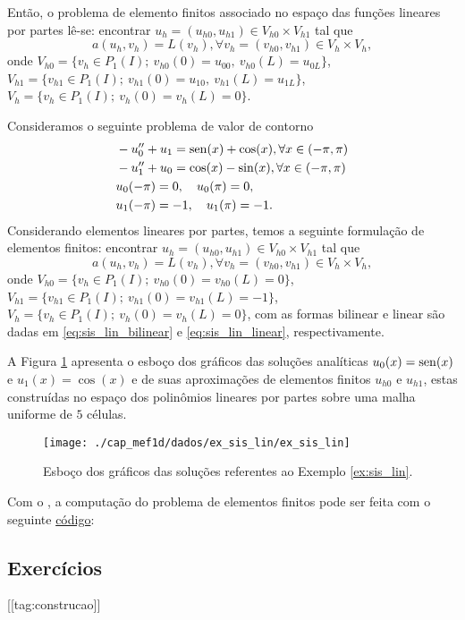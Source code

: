 Então, o problema de elemento finitos associado no espaço das funções lineares por partes lê-se: encontrar $u_h = (u_{h0}, u_{h1})\in V_{h0}\times V_{h1}$ tal que
\begin{equation}
  a(u_h, v_h) = L(v_h), \forall v_h = (v_{h0}, v_{h1})\in V_h\times V_h,
\end{equation}
onde $V_{h0} = \{v_h\in P_1(I);~v_{h0}(0)=u_{00},~v_{h0}(L)=u_{0L}\}$, $V_{h1}=\{v_{h1}\in P_1(I);~v_{h1}(0)=u_{10},~v_{h1}(L)=u_{1L}\}$, $V_h = \{v_h\in P_1(I);~v_h(0)=v_h(L)=0\}$.

\begin{ex}\label{ex:sis_lin}
  Consideramos o seguinte problema de valor de contorno
\begin{align}
  &-u_0'' + u_1 = \operatorname{sen}(x)+\cos(x),\forall x\in (-\pi, \pi)\\ 
  &-u_1'' + u_0 = \cos(x)-\sin(x),\forall x\in (-\pi, \pi)\\
  &u_0(-\pi)=0,\quad u_0(\pi)=0,\\
  &u_1(-\pi)=-1,\quad u_1(\pi)=-1.
\end{align}
Considerando elementos lineares por partes, temos a seguinte formulação de elementos finitos: encontrar $u_h = (u_{h0}, u_{h1})\in V_{h0}\times V_{h1}$ tal que
\begin{equation}
  a(u_h, v_h) = L(v_h), \forall v_h = (v_{h0}, v_{h1})\in V_h\times V_h,
\end{equation}
onde $V_{h0} = \{v_h\in P_1(I);~v_{h0}(0)=v_{h0}(L)=0\}$, $V_{h1}=\{v_{h1}\in P_1(I);~v_{h1}(0)=v_{h1}(L)=-1\}$, $V_h = \{v_h\in P_1(I);~v_h(0)=v_h(L)=0\}$, com as formas bilinear e linear são dadas em \eqref{eq:sis_lin_bilinear} e \eqref{eq:sis_lin_linear}, respectivamente.

A Figura \ref{fig:ex_sis_lin} apresenta o esboço dos gráficos das soluções analíticas $u_0(x)=\operatorname{sen}(x)$ e $u_1(x)=\cos(x)$ e de suas aproximações de elementos finitos $u_{h0}$ e $u_{h1}$, estas construídas no espaço dos polinômios lineares por partes sobre uma malha uniforme de $5$ células.

\begin{figure}[h!]
  \centering
  \texttt{[image: ./cap\_mef1d/dados/ex\_sis\_lin/ex\_sis\_lin]}
  \caption{Esboço dos gráficos das soluções referentes ao Exemplo \ref{ex:sis_lin}.}
  \label{fig:ex_sis_lin}
\end{figure}

\ifispython
Com o \fenics, a computação do problema de elementos finitos pode ser feita com o seguinte \href{https://github.com/phkonzen/notas/blob/master/src/MetodoElementosFinitos/cap_mef1d/dados/ex_sis_lin/ex_sis_lin.py}{código}:

\fi
\end{ex}

\subsection{Exercícios}
[[tag:construcao]]

